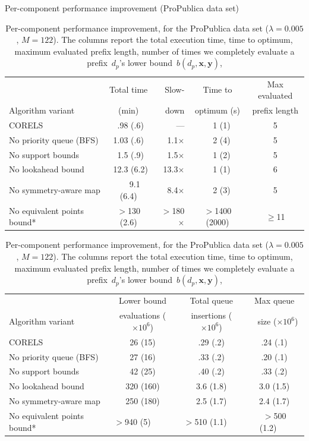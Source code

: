 \documentclass[twoside,11pt]{article}
\newcommand{\x}{\mathbf{x}}
\newcommand{\y}{\mathbf{y}}
\def\Prefix{d_p}
\def\Reg{{\lambda}}
\begin{document}
\begin{table}[t!]
\centering
Per-component performance improvement (ProPublica data set) \\
\vspace{1mm}
\begin{tabular}{l | c  r | c | c}
& Total time & Slow- & Time to & Max evaluated \\
Algorithm variant & (min) & down & optimum (s) & prefix length \\
\hline
CORELS & ~.98 (.6) & --- & ~~1 (1) & 5 \\
No priority queue (BFS) & 1.03 (.6) & 1.1$\times$ & ~~2 (4) & 5 \\
No support bounds & ~1.5 (.9) & 1.5$\times$ & ~~1 (2) & 5 \\
No lookahead bound & ~12.3 (6.2) & 13.3$\times$ & ~~1 (1) & 6 \\
No symmetry-aware map & ~~~9.1 (6.4) & 8.4$\times$ & ~~2 (3) & 5 \\
No equivalent points bound* & $>$130 (2.6) & $>$180$\times$ & $>$1400 (2000) & $\ge$11 \\
\hline
\end{tabular}
\begin{tabular}{l | c | c | c}
\hline
 & Lower bound & Total queue &  Max queue \\
Algorithm variant & evaluations ($\times 10^6$) & insertions ($\times 10^6$) &~ size ($\times 10^6$) \\
\hline
CORELS & 26 (15) & .29 (.2) & .24 (.1) \\
No priority queue (BFS) & 27 (16) & .33 (.2) & .20 (.1) \\
No support bounds & 42 (25) & .40 (.2) & .33 (.2) \\
No lookahead bound & 320 (160) & 3.6 (1.8) & 3.0 (1.5) \\
No symmetry-aware map & 250 (180) & 2.5 (1.7) & 2.4 (1.7) \\
No equivalent points bound* & $>$940 (5)~~~~~ & $>$510 (1.1)~~~ & $>$500 (1.2)~~~ \\
\end{tabular}
\caption{Per-component performance improvement, for the ProPublica data set
(${\Reg = 0.005}$, ${M = 122}$).
%
The columns report the total execution time,
time to optimum, maximum evaluated prefix length,
number of times we completely evaluate a prefix~$\Prefix$'s lower bound~$b(\Prefix, \x, \y)$,
}
\end{table}
\end{document}
